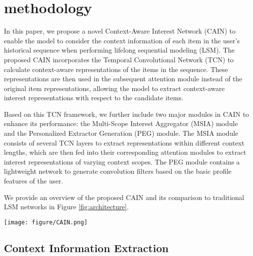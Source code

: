 \section{methodology}

In this paper, we propose a novel Context-Aware Interest Network (CAIN) to enable the model to consider the context information of each item in the user's historical sequence when performing lifelong sequential modeling (LSM). The proposed CAIN incorporates the Temporal Convolutional Network (TCN) to calculate context-aware representations of the items in the sequence. These representations are then used in the subsequent attention module instead of the original item representations, allowing the model to extract context-aware interest representations with respect to the candidate items.

Based on this TCN framework, we further include two major modules in CAIN to enhance its performance: the Multi-Scope Interest Aggregator (MSIA) module and the Personalized Extractor Generation (PEG) module. The MSIA module consists of several TCN layers to extract representations within different context lengths, which are then fed into their corresponding attention modules to extract interest representations of varying context scopes. The PEG module contains a lightweight network to generate convolution filters based on the basic profile features of the user.

We provide an overview of the proposed CAIN and its comparison to traditional LSM networks in Figure \ref{fig:architecture}. 

\begin{figure*}
    \centering
    \texttt{[image: figure/CAIN.png]}
    \caption{An overview of the proposed CAIN and its comparison to traditional LSM models. Figure (a) shows our baseline network that incorporates the LAP \cite{hou2024cross} for LSM. Figure (b) shows an upgraded model that incorporates the TCN framework proposed in CAIN. Figure (c) is the final version of the proposed CAIN, which includes the MSIA and PEG modules. }
    \label{fig:architecture}
    \vspace{-0.3cm}
\end{figure*}

\subsection{Context Information Extraction}

